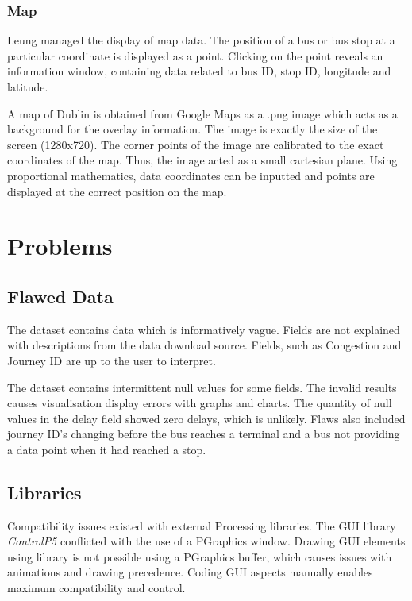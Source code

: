 \documentclass[]{article}
\begin{document}
	\subsubsection{Map}
	
	Leung managed the display of map data. The position of a bus or bus stop at a particular coordinate is displayed as a point. Clicking on the point reveals an information window, containing data related to bus ID, stop ID, longitude and latitude.
	
	A map of Dublin is obtained from Google Maps as a .png image which acts as a background for the overlay information. The image is exactly the size of the screen (1280x720). The corner points of the image are calibrated to the exact coordinates of the map. Thus, the image acted as a small cartesian plane. Using proportional mathematics, data coordinates can be inputted and points are displayed at the correct position on the map.
	
	\section{Problems}
	
	\subsection{Flawed Data}
	
	The dataset contains data which is informatively vague. Fields are not explained with descriptions from the data download source. Fields, such as Congestion and Journey ID are up to the user to interpret.
	
	The dataset contains intermittent null values for some fields. The invalid results causes visualisation display errors with graphs and charts. The quantity of null values in the delay field showed zero delays, which is unlikely. Flaws also included journey ID's changing before the bus reaches a terminal and a bus not providing a data point when it had reached a stop.
	
	\subsection{Libraries}
	
	Compatibility issues existed with external Processing libraries. The GUI library \textit{ControlP5} conflicted with the use of a PGraphics window. Drawing GUI elements using library is not possible using a PGraphics buffer, which causes issues with animations and drawing precedence. Coding GUI aspects manually enables maximum compatibility and control.
	
\end{document}
